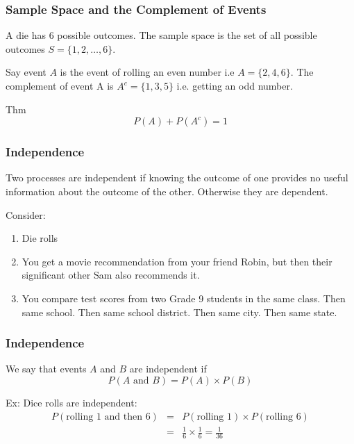 \documentclass[handout]{beamer}
\newcommand{\blue}[1]{\textcolor{blue2}{#1}}
\begin{document}
\begin{frame}
\frametitle{Sample Space and the Complement of Events}
A die has 6 possible outcomes.  The \blue{sample space} is the set of all possible outcomes $S = \{1, 2, \ldots, 6\}$.  

\pause \vspace{0.75cm}
Say event $A$ is the event of rolling an even number i.e $A=\{2, 4, 6\}$.  The \blue{complement of event} A is $A^c=\{1, 3, 5\}$ i.e. getting an odd number.  

\pause \vspace{0.75cm}
Thm
\[
P(A) + P(A^c) = 1
\]

\end{frame}


\begin{frame}
\frametitle{Independence}
Two processes are \blue{independent} if knowing the outcome of one provides no useful information about the outcome of the other.  Otherwise they are dependent.

\vspace{0.5cm}

\pause Consider:
\begin{enumerate}
\pause \item Die rolls
\pause \item You get a movie recommendation from your friend Robin, but then their significant other Sam also recommends it.  
\pause \item You compare test scores from two Grade 9 students in the same class.  Then same school.  Then same school district.  Then same city.  Then same state.
\end{enumerate}

\end{frame}


\begin{frame}
\frametitle{Independence}
We say that events $A$ and $B$ are \blue{independent} if
\[
P(A \mbox{ and } B) = P(A) \times P(B)
\]

\vspace{0.25cm}

\pause Ex: Dice rolls are independent:
\begin{eqnarray*}
P(\mbox{rolling 1 and then 6}) &=& P(\mbox{rolling 1}) \times P(\mbox{rolling 6})\\
&=& \frac{1}{6}\times\frac{1}{6} = \frac{1}{36}
\end{eqnarray*}

\end{frame}
\end{document}
